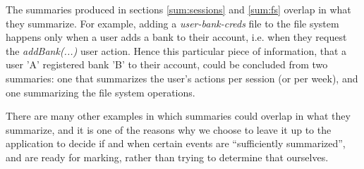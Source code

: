The summaries produced in sections \ref{sum:sessions} and \ref{sum:fs} overlap in what they summarize. For example, adding a \emph{user-bank-creds} file to the file system happens only when a user adds a bank to their account, i.e. when they request the \emph{addBank(...)} user action. Hence this particular piece of information, that a user 'A' registered bank 'B' to their account, could be concluded from two summaries: one that summarizes the user's actions per session (or per week), and one summarizing the file system operations.

There are many other examples in which summaries could overlap in what they summarize, and it is one of the reasons why we choose to leave it up to the application to decide if and when certain events are ``sufficiently summarized'', and are ready for marking, rather than trying to determine that ourselves.
